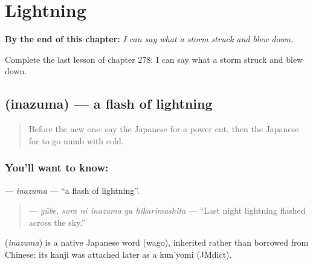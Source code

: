 
\chapter{Lightning}
\label{ch:ja-lightning}

\begin{chapteropening}
\textbf{By the end of this chapter:} \emph{I can say what a storm struck and blew down.}

Complete the last lesson of chapter 278: I can say what a storm struck and blew down.
\end{chapteropening}

\section[\texorpdfstring{\ja{いなずま} (inazuma)}{いなずま (inazuma)}]{ (inazuma) — a flash of lightning}

\label{lesson:JA-C278-inazuma}



\begin{quote}
Before the new one: say the Japanese for a power cut, then the Japanese for to go numb with cold.
\end{quote}

\subsection*{You'll want to know: }
\textbf{} — \emph{inazuma} — \textquotedblleft{}a flash of lightning\textquotedblright{}.

\begin{quote}
\textbf{  } — \emph{yūbe, sora ni inazuma ga hikarimashita} — \textquotedblleft{}Last night lightning flashed across the sky.\textquotedblright{}
\end{quote}

\begin{cousinweb}
\textbf{} (\emph{inazuma}) is a native Japanese word (wago), inherited rather than borrowed from Chinese; its kanji was attached later as a kun'yomi (JMdict).
\end{cousinweb}

